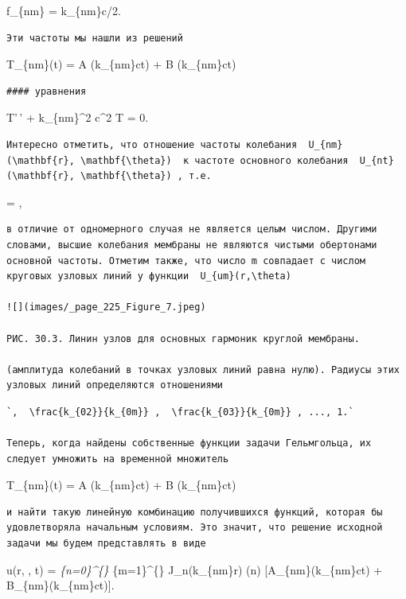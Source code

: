 \documentclass[
  ukrainian,
]{article}
\begin{document}
f\_\{nm\} = k\_\{nm\}c/2\pi.

\begin{verbatim}
Эти частоты мы нашли из решений
\end{verbatim}

T\_\{nm\}(t) = A \sin(k\_\{nm\}ct) + B \cos(k\_\{nm\}ct)

\begin{verbatim}
#### уравнения
\end{verbatim}

T'\,' + k\_\{nm\}\^{}2 c\^{}2 T = 0.

\begin{verbatim}
Интересно отметить, что отношение частоты колебания  U_{nm}(\mathbf{r}, \mathbf{\theta})  к частоте основного колебания  U_{nt}(\mathbf{r}, \mathbf{\theta}) , т.е.
\end{verbatim}

 =  ,

\begin{verbatim}
в отличие от одномерного случая не является целым числом. Другими словами, высшие колебания мембраны не являются чистыми обертонами основной частоты. Отметим также, что число m совпадает с числом круговых узловых линий у функции  U_{um}(r,\theta)

![](images/_page_225_Figure_7.jpeg)

РИС. 30.3. Линин узлов для основных гармоник круглой мембраны.

(амплитуда колебаний в точках узловых линий равна нулю). Радиусы этих узловых линий определяются отношениями
\end{verbatim}


\begin{verbatim}
`,  \frac{k_{02}}{k_{0m}} ,  \frac{k_{03}}{k_{0m}} , ..., 1.`

Теперь, когда найдены собственные функции задачи Гельмгольца, их следует умножить на временной множитель
\end{verbatim}

T\_\{nm\}(t) = A \sin(k\_\{nm\}ct) + B \cos(k\_\{nm\}ct)

\begin{verbatim}
и найти такую линейную комбинацию получившихся функций, которая бы удовлетворяла начальным условиям. Это значит, что решение исходной задачи мы будем представлять в виде
\end{verbatim}

u(r, \theta, t) = \sum\emph{\{n=0\}\^{}\{\infty\}
\sum}\{m=1\}\^{}\{\infty\} J\_n(k\_\{nm\}r) \cos(n\theta)
{[}A\_\{nm\}\sin(k\_\{nm\}ct) + B\_\{nm\}\cos(k\_\{nm\}ct){]}.
\end{document}
